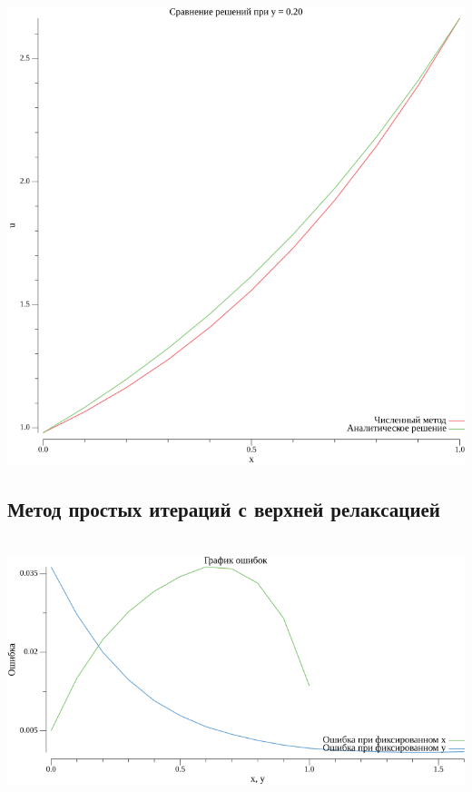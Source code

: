 \documentclass{article}
\begin{document}
\\
\includegraphics[scale=0.6]{1plot_y_0.20.png}
\\


\subsection*{Метод простых итераций с верхней релаксацией}
\\
\includegraphics[scale=0.6]{error_plot_2.png}
\\
\end{document}
